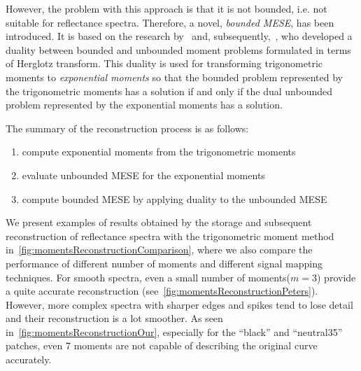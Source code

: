 However, the problem with this approach is that it is not bounded, i.e. not suitable for reflectance spectra. Therefore, a novel, \emph{bounded MESE}, has been introduced. It is based on the research by~\citet{dualityBoundedUnboundedMarkoff} and, subsequently,~\citet{dualityBoundedUnboundedKrein}, who developed a duality between bounded and unbounded moment problems formulated in terms of Herglotz transform. This duality is used for transforming trigonometric moments to \emph{exponential moments} so that the bounded problem represented by the trigonometric moments has a solution if and only if the dual unbounded problem represented by the exponential moments has a solution.

The summary of the reconstruction process is as follows:
\begin{enumerate}
	\item compute exponential moments from the trigonometric moments
	\item evaluate unbounded MESE for the exponential moments
	\item compute bounded MESE by applying duality to the unbounded MESE
\end{enumerate}

We present examples of results obtained by the storage and subsequent reconstruction of reflectance spectra with the trigonometric moment method in~\cref{fig:momentsReconstructionComparison}, where we also compare the performance of different number of moments and different signal mapping techniques. For smooth spectra, even a small number of moments($m=3$) provide a quite accurate reconstruction (see~\cref{fig:momentsReconstructionPeters}). However, more complex spectra with sharper edges and spikes tend to lose detail and their reconstruction is a lot smoother. As seen in~\cref{fig:momentsReconstructionOur}, especially for the ``black'' and ``neutral35'' patches, even 7 moments are not capable of describing the original curve accurately.

